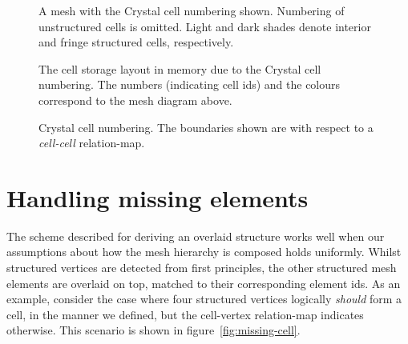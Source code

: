 \begin{figure}[H]
\sidebysidevertical
{
	
	\caption{A mesh with the Crystal cell numbering shown. Numbering of unstructured cells is omitted. Light and dark shades denote interior and fringe structured cells, respectively.}
}
{
	\small
	\tabcolsep=0.32mm
	
	\caption{The cell storage layout in memory due to the Crystal cell numbering. The numbers (indicating cell ids) and the colours correspond to the mesh diagram above.}
}
\caption{Crystal cell numbering. The boundaries shown are with respect to a \emph{cell-cell} relation-map.}
\label{fig:renumbering}
\end{figure}


\section{Handling missing elements}
\label{sec:missing-elements}
The scheme described for deriving an overlaid structure works well when our assumptions about how the mesh hierarchy is composed holds uniformly. Whilst structured vertices are detected from first principles, the other structured mesh elements are overlaid on top, matched to their corresponding element ids. As an example, consider the case where four structured vertices logically \emph{should} form a cell, in the manner we defined, but the cell-vertex relation-map indicates otherwise. This scenario is shown in figure~\ref{fig:missing-cell}.


